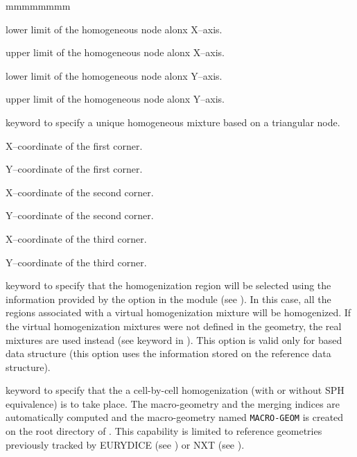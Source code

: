 \begin{ListeDeDescription}{mmmmmmmm}
\item[\dusa{xm}] lower limit of the homogeneous node alonx X--axis.

\item[\dusa{xp}] upper limit of the homogeneous node alonx X--axis.

\item[\dusa{ym}] lower limit of the homogeneous node alonx Y--axis.

\item[\dusa{yp}] upper limit of the homogeneous node alonx Y--axis.

\item[\moc{TRIA}] keyword to specify a unique homogeneous mixture based on a triangular node.

\item[\dusa{x1}] X--coordinate of the first corner.

\item[\dusa{y1}] Y--coordinate of the first corner.

\item[\dusa{x2}] X--coordinate of the second corner.

\item[\dusa{y2}] Y--coordinate of the second corner.

\item[\dusa{x3}] X--coordinate of the third corner.

\item[\dusa{y3}] Y--coordinate of the third corner.

\item[\moc{HMIX}] keyword to specify that the homogenization region will be selected using the information provided by the  option in the  module (see ). In this case, all the regions associated with a virtual homogenization mixture will be homogenized. If the virtual homogenization mixtures were not defined in the geometry, the real mixtures are used instead (see  keyword in ). This option is valid only for  based  data structure (this option uses the information stored on the reference  data structure).

\item[\moc{CELL}] keyword to specify that the a cell-by-cell homogenization
(with or without SPH equivalence) is to take place. The macro-geometry and the merging indices are automatically
computed and the macro-geometry named {\tt MACRO-GEOM} is created on the root directory of . This
capability is limited to reference geometries previously tracked by EURYDICE (see ) or NXT (see 
).


\end{ListeDeDescription}
